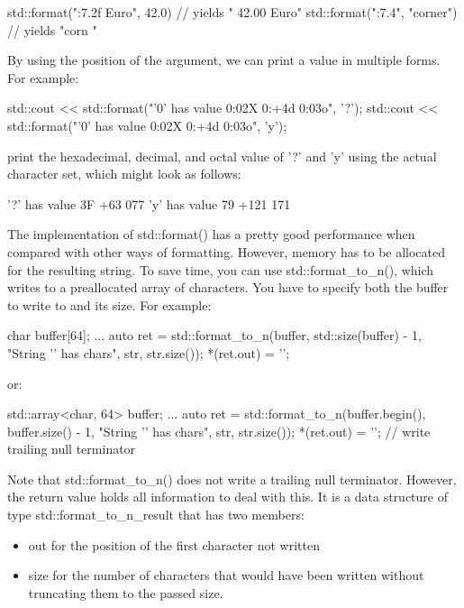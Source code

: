 \begin{cpp}
std::format("{:7.2f} Euro", 42.0) // yields " 42.00 Euro"
std::format("{:7.4}", "corner") // yields "corn "
\end{cpp}

By using the position of the argument, we can print a value in multiple forms. For example:

\begin{cpp}
std::cout << std::format("'{0}' has value {0:02X} {0:+4d} {0:03o}\n", '?');
std::cout << std::format("'{0}' has value {0:02X} {0:+4d} {0:03o}\n", 'y');
\end{cpp}

print the hexadecimal, decimal, and octal value of ’?’ and ’y’ using the actual character set, which might look as follows:

\begin{shell}
’?’ has value 3F +63 077
’y’ has value 79 +121 171
\end{shell}


The implementation of std::format() has a pretty good performance when compared with other ways of formatting. However, memory has to be allocated for the resulting string. To save time, you can use std::format\_to\_n(), which writes to a preallocated array of characters. You have to specify both the buffer to write to and its size. For example:

\begin{cpp}
char buffer[64];
...
auto ret = std::format_to_n(buffer, std::size(buffer) - 1,
							"String '{}' has {} chars\n", str, str.size());
*(ret.out) = '\0';
\end{cpp}

or:

\begin{cpp}
std::array<char, 64> buffer;
...
auto ret = std::format_to_n(buffer.begin(), buffer.size() - 1,
							"String '{}' has {} chars\n", str, str.size());
*(ret.out) = '\0'; // write trailing null terminator
\end{cpp}

Note that std::format\_to\_n() does not write a trailing null terminator. However, the return value holds all information to deal with this. It is a data structure of type std::format\_to\_n\_result that has two members:

\begin{itemize}
\item 
out for the position of the first character not written

\item 
size for the number of characters that would have been written without truncating them to the passed size.
\end{itemize}

